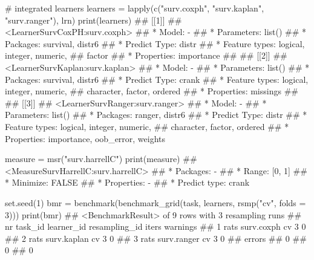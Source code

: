 \documentclass[12pt,]{scrbook}
\newenvironment{Shaded}{}{}
\newcommand{\CommentTok}[1]{\textcolor[rgb]{0.00,0.50,0.00}{#1}}
\newcommand{\DataTypeTok}[1]{#1}
\newcommand{\DecValTok}[1]{#1}
\newcommand{\KeywordTok}[1]{\textcolor[rgb]{0.00,0.00,1.00}{#1}}
\newcommand{\NormalTok}[1]{#1}
\newcommand{\StringTok}[1]{\textcolor[rgb]{0.00,0.50,0.50}{#1}}
\begin{document}
\begin{Shaded}
\begin{Highlighting}[]
\CommentTok{# integrated learners}
\NormalTok{learners =}\StringTok{ }\KeywordTok{lapply}\NormalTok{(}\KeywordTok{c}\NormalTok{(}\StringTok{"surv.coxph"}\NormalTok{, }\StringTok{"surv.kaplan"}\NormalTok{, }\StringTok{"surv.ranger"}\NormalTok{), }
\NormalTok{  lrn)}
\KeywordTok{print}\NormalTok{(learners)}
\NormalTok{## [[1]]}
\NormalTok{## <LearnerSurvCoxPH:surv.coxph>}
\NormalTok{## * Model: -}
\NormalTok{## * Parameters: list()}
\NormalTok{## * Packages: survival, distr6}
\NormalTok{## * Predict Type: distr}
\NormalTok{## * Feature types: logical, integer, numeric,}
\NormalTok{##   factor}
\NormalTok{## * Properties: importance}
\NormalTok{## }
\NormalTok{## [[2]]}
\NormalTok{## <LearnerSurvKaplan:surv.kaplan>}
\NormalTok{## * Model: -}
\NormalTok{## * Parameters: list()}
\NormalTok{## * Packages: survival, distr6}
\NormalTok{## * Predict Type: crank}
\NormalTok{## * Feature types: logical, integer, numeric,}
\NormalTok{##   character, factor, ordered}
\NormalTok{## * Properties: missings}
\NormalTok{## }
\NormalTok{## [[3]]}
\NormalTok{## <LearnerSurvRanger:surv.ranger>}
\NormalTok{## * Model: -}
\NormalTok{## * Parameters: list()}
\NormalTok{## * Packages: ranger, distr6}
\NormalTok{## * Predict Type: distr}
\NormalTok{## * Feature types: logical, integer, numeric,}
\NormalTok{##   character, factor, ordered}
\NormalTok{## * Properties: importance, oob_error, weights}

\NormalTok{measure =}\StringTok{ }\KeywordTok{msr}\NormalTok{(}\StringTok{"surv.harrellC"}\NormalTok{)}
\KeywordTok{print}\NormalTok{(measure)}
\NormalTok{## <MeasureSurvHarrellC:surv.harrellC>}
\NormalTok{## * Packages: -}
\NormalTok{## * Range: [0, 1]}
\NormalTok{## * Minimize: FALSE}
\NormalTok{## * Properties: -}
\NormalTok{## * Predict type: crank}

\KeywordTok{set.seed}\NormalTok{(}\DecValTok{1}\NormalTok{)}
\NormalTok{bmr =}\StringTok{ }\KeywordTok{benchmark}\NormalTok{(}\KeywordTok{benchmark_grid}\NormalTok{(task, learners, }\KeywordTok{rsmp}\NormalTok{(}\StringTok{"cv"}\NormalTok{, }
  \DataTypeTok{folds =} \DecValTok{3}\NormalTok{)))}
\KeywordTok{print}\NormalTok{(bmr)}
\NormalTok{## <BenchmarkResult> of 9 rows with 3 resampling runs}
\NormalTok{##  nr task_id  learner_id resampling_id iters warnings}
\NormalTok{##   1    rats  surv.coxph            cv     3        0}
\NormalTok{##   2    rats surv.kaplan            cv     3        0}
\NormalTok{##   3    rats surv.ranger            cv     3        0}
\NormalTok{##  errors}
\NormalTok{##       0}
\NormalTok{##       0}
\NormalTok{##       0}
\end{Highlighting}
\end{Shaded}
\end{document}
